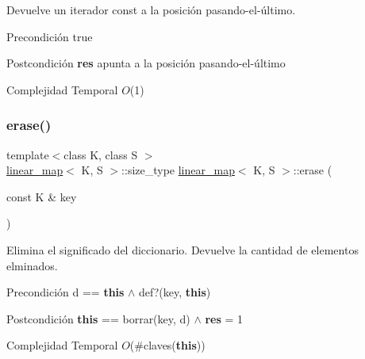 Devuelve un iterador const a la posición pasando-\/el-\/último. 

\begin{DoxyPrecond}{Precondición}
true 
\end{DoxyPrecond}
\begin{DoxyPostcond}{Postcondición}
{\bfseries res} apunta a la posición pasando-\/el-\/último
\end{DoxyPostcond}

\begin{DoxyDescription}
\item[Complejidad Temporal]$O$(1)
\end{DoxyDescription}\mbox{\label{classlinear__map_a932198aa420701fb84af74434764be9d}} 
\subsubsection{\texorpdfstring{erase()}{erase()}}
{\footnotesize\ttfamily template$<$class K, class S $>$ \\
\mbox{\hyperlink{classlinear__map}{linear\+\_\+map}}$<$ K, S $>$\+::size\+\_\+type \mbox{\hyperlink{classlinear__map}{linear\+\_\+map}}$<$ K, S $>$\+::erase (\begin{DoxyParamCaption}\item[{const K \&}]{key }\end{DoxyParamCaption})}



Elimina el significado del diccionario. Devuelve la cantidad de elementos elminados. 

\begin{DoxyPrecond}{Precondición}
d == {\bfseries this} $\land$ def?(key, {\bfseries this}) 
\end{DoxyPrecond}
\begin{DoxyPostcond}{Postcondición}
{\bfseries this} == borrar(key, d) $\land$ {\bfseries res} = 1
\end{DoxyPostcond}

\begin{DoxyDescription}
\item[Complejidad Temporal]$O$(\#claves({\bfseries this}))
\end{DoxyDescription}\mbox{\label{classlinear__map_a6f04a74f63434402f7198aaac798d9da}} 
